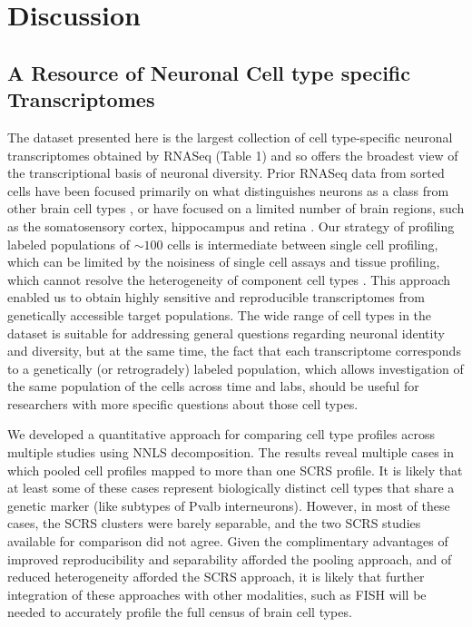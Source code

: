
\section{Discussion}

\subsection{A Resource of Neuronal Cell type specific Transcriptomes}
The dataset presented here is the largest collection of cell type-specific neuronal transcriptomes obtained by RNASeq (Table 1) and so offers the broadest view of the transcriptional basis of neuronal diversity. Prior RNASeq data from sorted cells have been focused primarily on what distinguishes neurons as a class from other brain cell types \cite{Zhang_2014}, or have focused on a limited number of brain regions, such as the somatosensory cortex, hippocampus  \cite{Zeisel_2015} and retina \cite{Macosko_2015}. Our strategy of profiling labeled populations of $\sim100$ cells is intermediate between single cell profiling, which can be limited by the noisiness of single cell assays \cite{Marinov_2013} and tissue profiling, which cannot resolve the heterogeneity of component cell types \cite{Nelson_2006}. This approach enabled us to obtain highly sensitive and reproducible transcriptomes from genetically accessible target populations. The wide range of cell types in the dataset is suitable for addressing general questions regarding neuronal identity and diversity, but at the same time, the fact that each transcriptome corresponds to a genetically (or retrogradely) labeled population, which allows investigation of the same population of the cells across time and labs, should be useful for researchers with more specific questions about those cell types.

We developed a quantitative approach for comparing cell type profiles across multiple studies using NNLS decomposition. The results reveal multiple cases in which pooled cell profiles mapped to more than one SCRS profile. It is likely that at least some of these cases represent biologically distinct cell types that share a genetic marker (like subtypes of Pvalb interneurons). However, in most of these cases, the SCRS clusters were barely separable, and the two SCRS studies available for comparison did not agree. Given the complimentary advantages of improved reproducibility and separability afforded the pooling approach, and of reduced heterogeneity afforded the SCRS approach, it is likely that further integration of these approaches with other modalities, such as FISH \cite{Moffitt_2016} will be needed to accurately profile the full census of brain cell types. 

